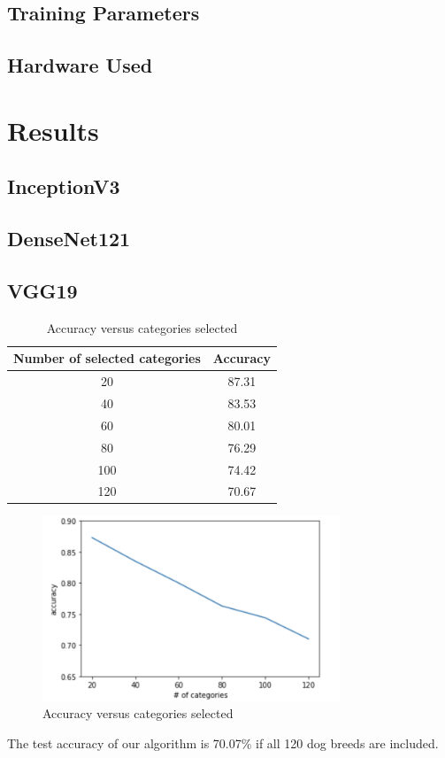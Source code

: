 \documentclass{article}
\begin{document}
\subsection{Training Parameters}
\subsection{Hardware Used}

\newpage
\section{Results}

\subsection{InceptionV3}
\subsection{DenseNet121}
\subsection{VGG19}
\begin{table}[h]
	\centering
	
	\begin{tabular}{|c|c|}
		\hline
		Number of selected categories & Accuracy \\\hline
		20 & 87.31\\
		40 & 83.53\\
		60 & 80.01\\
		80 & 76.29\\
		100 & 74.42\\
		120 & 70.67\\
		\hline
	\end{tabular}
\caption{Accuracy versus categories selected}
\end{table}
\begin{figure}[H]
	\centering
	\includegraphics[width=3.5in]{pics/vgg19_1} 
	\caption{Accuracy versus categories selected}
\end{figure}
The test accuracy of our algorithm is 70.07\% if all 120 dog breeds are included. 
\end{document}
